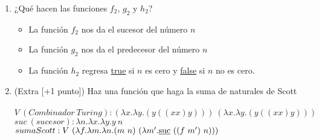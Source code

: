 \documentclass[11pt, a4paper]{report}
\begin{document}
\begin{enumerate}[label=\alph*)]
\begin{itemize}
    \end{itemize}
	\item ¿Qué hacen las funciones $f_{2}$, $g_{2}$ y $h_{2}$?
    \begin{itemize}
    \item La función $f_{2}$ nos da el sucesor del número $n$
    \item La función $g_{2}$ nos da el predecesor del número $n$
    \item La función $h_{2}$ regresa \underline{true} si $n$ es cero y \underline{false} si 
    $n$ no es cero.
    \end{itemize}
    \item (Extra [+1 punto]) Haz una función que haga la suma de naturales de Scott\\\\
    $ V\ (Combinador\ Turing): (\lambda x.\lambda y.(y((xx)y)))\ (\lambda x.\lambda y.
    (y((xx)y))) $\\
    $ suc\ (sucesor): \lambda n.\lambda x.\lambda y.y\ n $\\
    $ sumaScott: V\ (\lambda f.\lambda m.\lambda n.(m\ n)\ (\lambda m'.\text{\underline{suc}}\ ((f\ m')\ n))) $
  \end{enumerate}
  
\end{document}
